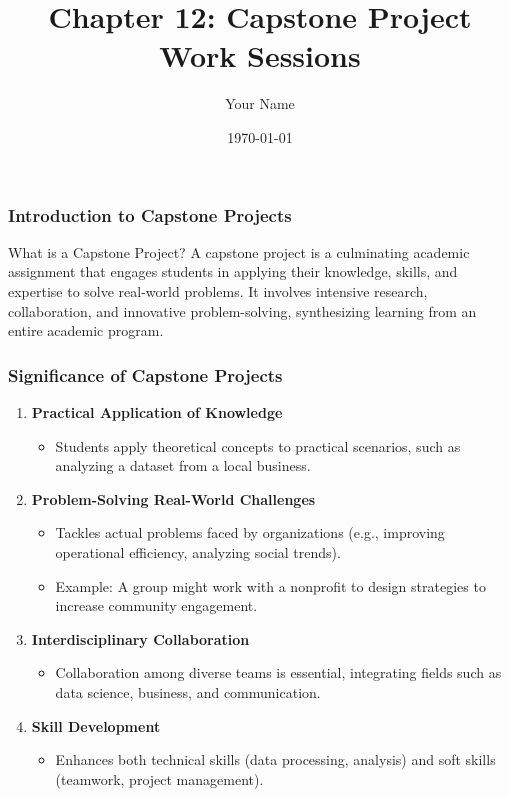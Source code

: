 \documentclass{beamer}
\title{Chapter 12: Capstone Project Work Sessions}
\author{Your Name}
\institute{Your Institution}
\date{\today}
\begin{document}
\frame{\titlepage}

\begin{frame}[fragile]
    \frametitle{Introduction to Capstone Projects}
    \begin{block}{What is a Capstone Project?}
        A capstone project is a culminating academic assignment that engages students in applying their knowledge, skills, and expertise to solve real-world problems. It involves intensive research, collaboration, and innovative problem-solving, synthesizing learning from an entire academic program.
    \end{block}
\end{frame}

\begin{frame}[fragile]
    \frametitle{Significance of Capstone Projects}
    \begin{enumerate}
        \item \textbf{Practical Application of Knowledge}
        \begin{itemize}
            \item Students apply theoretical concepts to practical scenarios, such as analyzing a dataset from a local business.
        \end{itemize}

        \item \textbf{Problem-Solving Real-World Challenges}
        \begin{itemize}
            \item Tackles actual problems faced by organizations (e.g., improving operational efficiency, analyzing social trends).
            \item Example: A group might work with a nonprofit to design strategies to increase community engagement.
        \end{itemize}

        \item \textbf{Interdisciplinary Collaboration}
        \begin{itemize}
            \item Collaboration among diverse teams is essential, integrating fields such as data science, business, and communication.
        \end{itemize}

        \item \textbf{Skill Development}
        \begin{itemize}
            \item Enhances both technical skills (data processing, analysis) and soft skills (teamwork, project management).
        \end{itemize}
    \end{enumerate}
\end{frame}
\end{document}

